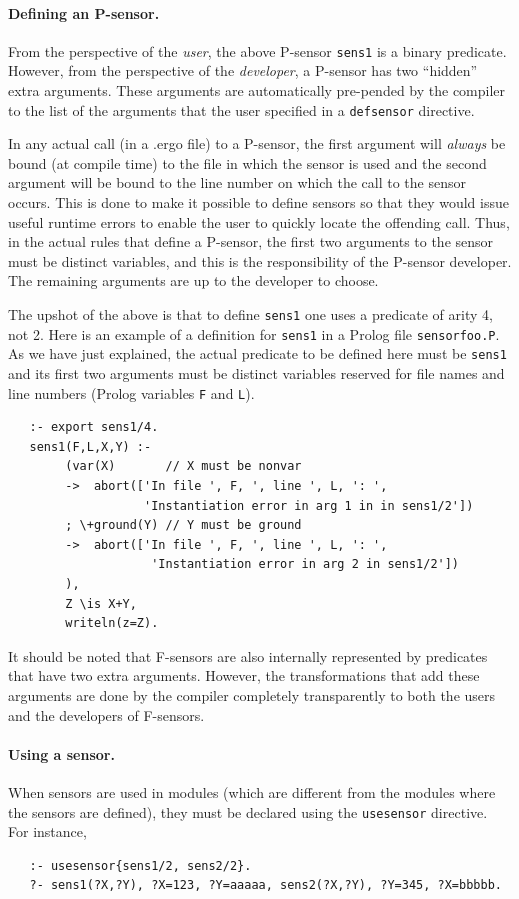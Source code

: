 \documentclass[11pt]{article}
\newcommand{\ERGO}{\mbox{\smaller{\ensuremath{\cal{E}}\smaller{{\sc{RGO}}}}}\xspace}
\newcommand{\FLSYSTEM}{\ERGO}
\newcommand{\ergoext}{ergo\xspace}
\begin{document}
\paragraph{Defining an P-sensor.}
From the perspective of the \emph{user}, the above P-sensor
\texttt{sens1} is
a binary predicate. However, 
from the perspective of the \emph{developer}, a P-sensor has two
``hidden'' extra arguments. These arguments 
are automatically pre-pended by the compiler to the list of the arguments
that the user specified in a \texttt{defsensor} directive. 

In any actual call (in a .\ergoext file) to a P-sensor, the first argument will
\emph{always} be bound (at compile time) to the
file in which the sensor is used and the second 
argument will be bound to the line number
on which the call to the sensor occurs.
This is done to make it possible to define sensors so that they
would issue useful runtime errors to
enable the user to quickly locate the offending call. 
Thus, in the actual rules that define a P-sensor,
the first two arguments to the sensor must be distinct variables, and this
is the responsibility of the P-sensor developer.
The remaining arguments are up to the developer to choose.

The upshot of the above is that
to define \texttt{sens1} one uses
a predicate of arity 4, not 2.  
Here is an example of a definition for \texttt{sens1} in a Prolog file
\texttt{sensorfoo.P}. As we have just
explained, the actual predicate to be defined here must be \texttt{sens1}
and its first two arguments must be distinct variables 
reserved for file names and line numbers
(Prolog variables \texttt{F} and \texttt{L}).  
\begin{verbatim}
   :- export sens1/4.
   sens1(F,L,X,Y) :-
        (var(X)       // X must be nonvar
        ->  abort(['In file ', F, ', line ', L, ': ',
                   'Instantiation error in arg 1 in in sens1/2'])
        ; \+ground(Y) // Y must be ground
        ->  abort(['In file ', F, ', line ', L, ': ',
                    'Instantiation error in arg 2 in sens1/2'])
        ),
        Z \is X+Y,
        writeln(z=Z).
\end{verbatim}

It should be noted that F-sensors are also internally represented by
predicates that have two extra arguments. However, the transformations that
add these arguments are done by the \FLSYSTEM compiler completely
transparently to both the users and the developers of F-sensors.

\paragraph{Using a sensor.}
When sensors are
used in \FLSYSTEM modules (which are different from the modules where the
sensors are defined), they must be declared using the
\texttt{usesensor} directive.  For instance,
\begin{verbatim}
   :- usesensor{sens1/2, sens2/2}.
   ?- sens1(?X,?Y), ?X=123, ?Y=aaaaa, sens2(?X,?Y), ?Y=345, ?X=bbbbb.
\end{verbatim}
\end{document}
